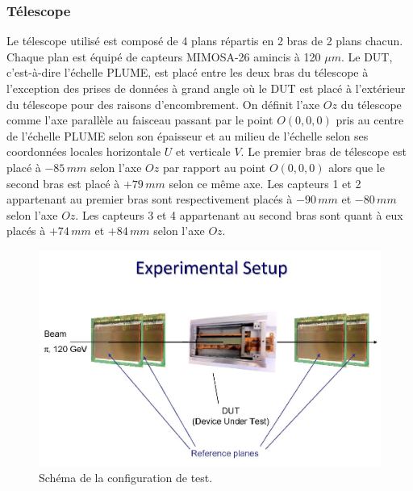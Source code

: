   \subsubsection{T\'elescope}

  Le t\'elescope utilis\'e est compos\'e de 4 plans r\'epartis en 2 bras de 2 plans chacun. Chaque plan est \'equipé de capteurs MIMOSA-26 amincis \`a 120 $\mu m$. Le DUT, c'est-à-dire l'\'echelle PLUME, est plac\'e entre les deux bras du télescope \`a l'exception des prises de donn\'ees \`a grand angle où le DUT est plac\'e \`a l'ext\'erieur du t\'elescope pour des raisons d'encombrement. On d\'efinit l'axe $Oz$ du t\'elescope comme l'axe parall\`ele au faisceau passant par le point $O(0,0,0)$ pris au centre de l'\'echelle PLUME selon son \'epaisseur et au milieu de l'\'echelle selon ses coordonn\'ees locales horizontale $U$ et verticale $V$. Le premier bras de télescope est plac\'e \`a $-85 \, mm$ selon l'axe $Oz$ par rapport au point $O(0,0,0)$ alors que le second bras est plac\'e \`a $+79 \, mm$ selon ce m\^eme axe. Les capteurs 1 et 2 appartenant au premier bras sont respectivement plac\'es \`a $-90 \, mm$ et $-80 \, mm$ selon l'axe $Oz$. Les capteurs 3 et 4 appartenant au second bras sont quant \`a eux plac\'es \`a $+74 \, mm$ et $+84 \, mm$ selon l'axe $Oz$.
  
    \begin{figure}[!htb]
    \begin{center} 
     \includegraphics[scale=0.30]{./figures/Plots_PLUME/schema_montage.png}
     \caption{Schéma de la configuration de test.}
     \label{fig:confTelPLUME}
    \end{center}
  \end{figure}
  
